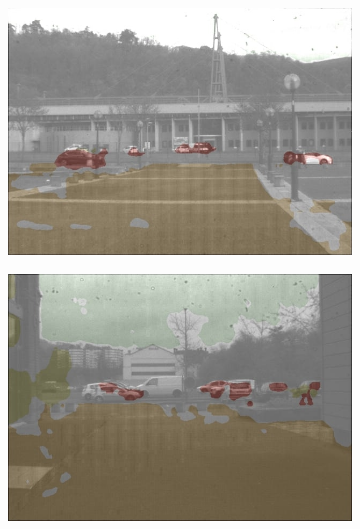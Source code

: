 \begin{figure}[h]
\begin{subfigure}[b]{0.18\linewidth}
	\end{subfigure}
	
	\vspace{0.1cm} 
	
	
	\begin{subfigure}[b]{0.18\linewidth}   
		\centering 
		\includegraphics[width=\linewidth]{Figures/Aug/CA2/selected_images/overlayed/over1205.jpg}
	\end{subfigure}
	\begin{subfigure}[b]{0.18\linewidth}
		\centering
		\includegraphics[width=\linewidth]{Figures/Aug/CA2/selected_images/overlayed/over4427.jpg}
	\end{subfigure}
	\begin{subfigure}[b]{0.18\linewidth}  
		\centering 

\end{subfigure}
\end{figure}

